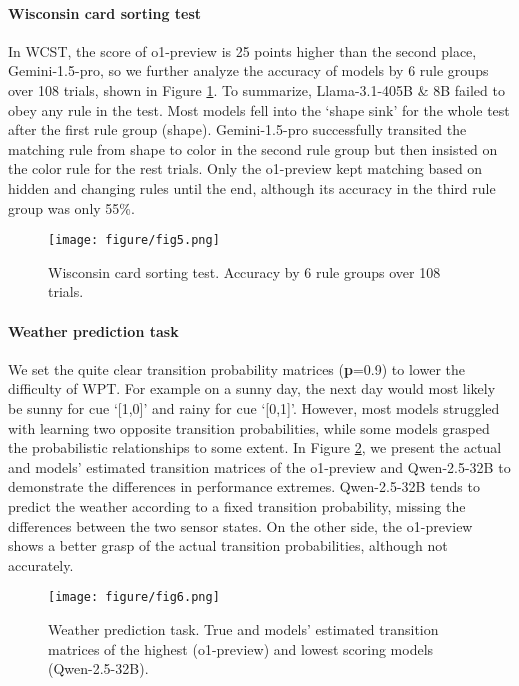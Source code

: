 \paragraph{Wisconsin card sorting test} In WCST, the score of o1-preview is 25 points higher than the second place, Gemini-1.5-pro, so we further analyze the accuracy of models by 6 rule groups over 108 trials, shown in Figure \ref{fig5}. To summarize, Llama-3.1-405B \& 8B failed to obey any rule in the test. Most models fell into the `shape sink' for the whole test after the first rule group (shape). Gemini-1.5-pro successfully transited the matching rule from shape to color in the second rule group but then insisted on the color rule for the rest trials. Only the o1-preview kept matching based on hidden and changing rules until the end, although its accuracy in the third rule group was only 55\%.
 \begin{figure}
     \centering
     \texttt{[image: figure/fig5.png]}
     \caption{Wisconsin card sorting test. Accuracy by 6 rule groups over 108 trials.}
     \label{fig5}
 \end{figure}
\paragraph{Weather prediction task} We set the quite clear transition probability matrices (\textbf{p}=0.9) to lower the difficulty of WPT. For example on a sunny day, the next day would most likely be sunny for cue `[1,0]' and rainy for cue `[0,1]'. However, most models struggled with learning two opposite transition probabilities, while some models grasped the probabilistic relationships to some extent. In Figure \ref{fig6}, we present the actual and models' estimated transition matrices of the o1-preview and Qwen-2.5-32B to demonstrate the differences in performance extremes. Qwen-2.5-32B tends to predict the weather according to a fixed transition probability, missing the differences between the two sensor states. On the other side, the o1-preview shows a better grasp of the actual transition probabilities, although not accurately.

\begin{figure}
    \centering
    \texttt{[image: figure/fig6.png]}
    \caption{Weather prediction task. True and models' estimated transition matrices of the highest (o1-preview) and lowest scoring models (Qwen-2.5-32B).}
    \label{fig6}
\end{figure}

